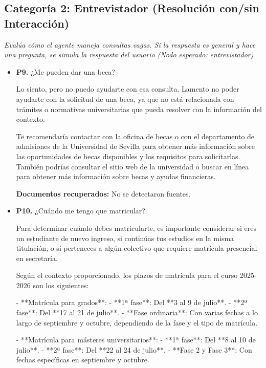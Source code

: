 \documentclass{article}
\begin{document}
\subsection{Categoría 2: Entrevistador (Resolución con/sin Interacción)}
\textit{Evalúa cómo el agente maneja consultas vagas. Si la respuesta es general y hace una pregunta, se simula la respuesta del usuario (Nodo esperado: entrevistador)}
\begin{itemize}
  \item \textbf{P9.} ¿Me pueden dar una beca? \\
    \begin{respuesta_agente}
      Lo siento, pero no puedo ayudarte con esa consulta. Lamento no poder ayudarte con la solicitud de una beca, ya que no está relacionada con trámites o normativas universitarias que pueda resolver con la información del contexto.

Te recomendaría contactar con la oficina de becas o con el departamento de admisiones de la Universidad de Sevilla para obtener más información sobre las oportunidades de becas disponibles y los requisitos para solicitarlas. También podrías consultar el sitio web de la universidad o buscar en línea para obtener más información sobre becas y ayudas financieras.
    \end{respuesta_agente}
    \vspace{0.2cm}
    \noindent\textbf{Documentos recuperados:} No se detectaron fuentes.

  \item \textbf{P10.} ¿Cuándo me tengo que matricular? \\
    \begin{respuesta_agente}
      Para determinar cuándo debes matricularte, es importante considerar si eres un estudiante de nuevo ingreso, si continúas tus estudios en la misma titulación, o si perteneces a algún colectivo que requiere matrícula presencial en secretaría.

Según el contexto proporcionado, los plazos de matrícula para el curso 2025-2026 son los siguientes:

- **Matrícula para grados**: 
  - **1ª fase**: Del **3 al 9 de julio**.
  - **2ª fase**: Del **17 al 21 de julio**.
  - **Fase ordinaria**: Con varias fechas a lo largo de septiembre y octubre, dependiendo de la fase y el tipo de matrícula.

- **Matrícula para másteres universitarios**:
  - **1ª fase**: Del **8 al 10 de julio**.
  - **2ª fase**: Del **22 al 24 de julio**.
  - **Fase 2 y Fase 3**: Con fechas específicas en septiembre y octubre.


\end{respuesta_agente}
\end{itemize}
\end{document}
